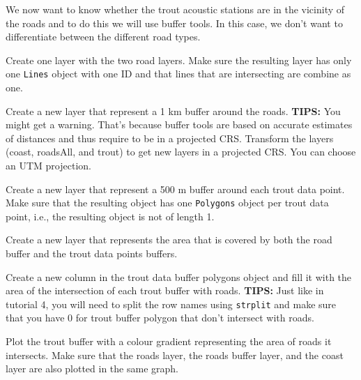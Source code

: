 \documentclass[11pt, oneside]{article}   	%
\begin{document}
\begin{Exercise}

We now want to know whether the trout acoustic stations are in the vicinity of the roads and to do this we will use buffer tools. In this case, we don't want to differentiate between the different road types.

\Question Create one layer with the two road layers. Make sure the resulting layer has only one \texttt{Lines} object with one ID and that lines that are intersecting are combine as one.

\Question Create a new layer that represent a 1 km buffer around the roads. \textbf{TIPS:} You might get a warning. That's because buffer tools are based on accurate estimates of distances and thus require to be in a projected CRS. Transform the layers (coast, roadsAll, and trout) to get new layers in a projected CRS. You can choose an UTM projection.

\Question Create a new layer that represent a 500 m buffer around each trout data point. Make sure that the resulting object has one \texttt{Polygons} object per trout data point, i.e., the resulting object is not of length 1.

\Question Create a new layer that represents the area that is covered by both the road buffer and the trout data points buffers.

\Question Create a new column in the trout data buffer polygons object and fill it with the area of the intersection of each trout buffer with roads. \textbf{TIPS:} Just like in tutorial 4, you will need to split the row names using \texttt{strplit} and make sure that you have 0 for trout buffer polygon that don't intersect with roads.

\end{Exercise}

\begin{Exercise}

Plot the trout buffer with a colour gradient representing the area of roads it intersects. Make sure that the roads layer, the roads buffer layer, and the coast layer are also plotted in the same graph.

\end{Exercise}
\end{document}
